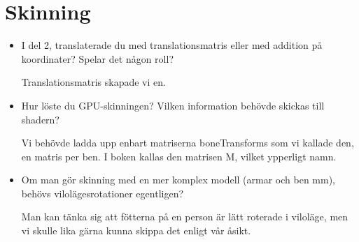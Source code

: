 \documentclass[a4paper,12pt]{article}
\begin{document}
\section{Skinning}

\begin{itemize}
\item  I del 2, translaterade du med translationsmatris eller med addition på koordinater? Spelar det någon roll?

  Translationsmatris skapade vi en.

\item  Hur löste du GPU-skinningen? Vilken information behövde skickas till shadern?

  Vi behövde ladda upp enbart matriserna boneTransforms som vi kallade den, en matris per ben. I boken kallas den matrisen M, vilket ypperligt namn.

\item  Om man gör skinning med en mer komplex modell (armar och ben mm), behövs vilolägesrotationer egentligen?

  Man kan tänka sig att fötterna på en person är lätt roterade i viloläge, men vi skulle lika gärna kunna skippa det enligt vår åsikt.

\end{itemize}
\end{document}
